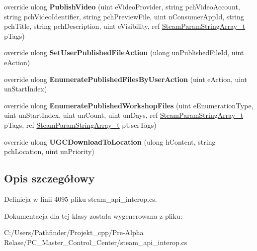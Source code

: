 \begin{DoxyCompactItemize}
\item 
\mbox{\label{class_valve_1_1_steamworks_1_1_c_steam_remote_storage_a35125702d7d8a7a05383bcf6f6e21e57}} 
override ulong {\bfseries Publish\+Video} (uint e\+Video\+Provider, string pch\+Video\+Account, string pch\+Video\+Identifier, string pch\+Preview\+File, uint n\+Consumer\+App\+Id, string pch\+Title, string pch\+Description, uint e\+Visibility, ref \hyperlink{struct_valve_1_1_steamworks_1_1_steam_param_string_array__t}{Steam\+Param\+String\+Array\+\_\+t} p\+Tags)
\item 
\mbox{\label{class_valve_1_1_steamworks_1_1_c_steam_remote_storage_a2c65f97ee94a1e5829c43ec04e3ce3dd}} 
override ulong {\bfseries Set\+User\+Published\+File\+Action} (ulong un\+Published\+File\+Id, uint e\+Action)
\item 
\mbox{\label{class_valve_1_1_steamworks_1_1_c_steam_remote_storage_a9dad49fbac1fbd4524fdab557c0c3aa4}} 
override ulong {\bfseries Enumerate\+Published\+Files\+By\+User\+Action} (uint e\+Action, uint un\+Start\+Index)
\item 
\mbox{\label{class_valve_1_1_steamworks_1_1_c_steam_remote_storage_af638d95a2f6f26c653a17bbcdcd5b4ca}} 
override ulong {\bfseries Enumerate\+Published\+Workshop\+Files} (uint e\+Enumeration\+Type, uint un\+Start\+Index, uint un\+Count, uint un\+Days, ref \hyperlink{struct_valve_1_1_steamworks_1_1_steam_param_string_array__t}{Steam\+Param\+String\+Array\+\_\+t} p\+Tags, ref \hyperlink{struct_valve_1_1_steamworks_1_1_steam_param_string_array__t}{Steam\+Param\+String\+Array\+\_\+t} p\+User\+Tags)
\item 
\mbox{\label{class_valve_1_1_steamworks_1_1_c_steam_remote_storage_a635c169482588bed29828a5036ea8ccf}} 
override ulong {\bfseries U\+G\+C\+Download\+To\+Location} (ulong h\+Content, string pch\+Location, uint un\+Priority)
\end{DoxyCompactItemize}


\subsection{Opis szczegółowy}


Definicja w linii 4095 pliku steam\+\_\+api\+\_\+interop.\+cs.



Dokumentacja dla tej klasy została wygenerowana z pliku\+:\begin{DoxyCompactItemize}
\item 
C\+:/\+Users/\+Pathfinder/\+Projekt\+\_\+cpp/\+Pre-\/\+Alpha Relase/\+P\+C\+\_\+\+Master\+\_\+\+Control\+\_\+\+Center/steam\+\_\+api\+\_\+interop.\+cs\end{DoxyCompactItemize}
